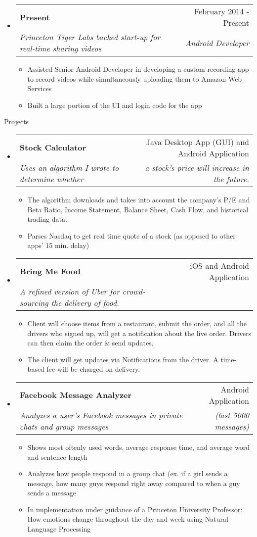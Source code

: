 \documentclass[letterpaper,11pt]{article}
\makeatletter
\newcommand{\resitem}[1]{\item #1 \vspace{-2pt}}
\newcommand{\resheading}[1]{{\large \parashade[.9]{sharpcorners}{\textbf{#1 \vphantom{p\^{E}}}}}}
\newcommand{\ressubheading}[4]{
\begin{tabular*}{6.5in}{l@{\extracolsep{\fill}}r}
		\textbf{#1} & #2 \\
		\textit{#3} & \textit{#4} \\
\end{tabular*}\vspace{-6pt}}
\makeatother
\begin{document}
\begin{itemize}
\item
	\ressubheading{Present}{February 2014 - Present}
		{Princeton Tiger Labs backed start-up for real-time 				sharing videos} {Android Developer}
		\begin {itemize}
		\resitem{Assisted Senior Android Developer in 						developing a custom recording app to record videos 				while simultaneously uploading them to Amazon Web 				Services}
		\resitem{Built a large portion of the UI and login code 			for the app}
		\end{itemize}
\end{itemize}


\begin{description} 
	\item[Projects] 
\end{description}

\begin{itemize}

\item
	\ressubheading{Stock Calculator}{Java Desktop App (GUI) and 		Android Application}{Uses an algorithm I wrote to 				determine whether}{a stock's price will increase in the 		future.\space\space\space\space\space\space\space\space			\space}
	\begin{itemize}
		\resitem{The algorithm downloads and takes into account 			the company's P/E and Beta Ratio, Income Statement, 			Balance Sheet, Cash Flow, and historical trading 					data.}
		\resitem{Parses Nasdaq to get real time quote of a 					stock (as opposed to other apps' 15 min. delay)}
	\end{itemize}

\item
	\ressubheading{Bring Me Food}{iOS and Android Application}
		{A refined version of Uber for crowd-sourcing the 				delivery of food.}{}
	\begin{itemize}
		\resitem{Client will choose items from a restaurant, submit the order, and all the drivers who signed up, will get a notification about the live order. Drivers can then claim the order \& send updates.}
		\resitem{The client will get updates via Notifications from the driver. A time-based fee will be charged on delivery.}
	\end{itemize}
	
\item
	\ressubheading{Facebook Message Analyzer}
		{Android Application}{Analyzes a user's Facebook 					messages in private chats and group messages}{(last 				5000 messages)\space\space\space\space\space\space}
	\begin{itemize}
		\resitem{Shows most oftenly used words, average 						response time, and average word and sentence 					length}
		\resitem{Analyzes how people respond in a group chat 					(ex. if a girl sends a message, how many guys 					respond right away compared to when a guy sends a 				message}
		\resitem{In implementation under guidance of a 						Princeton University Professor: How emotions change
			throughout the day and week using Natural Language 				Processing}
	\end{itemize}
\end{itemize}
\end{document}
